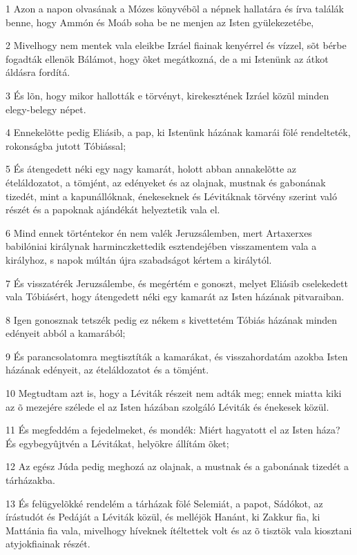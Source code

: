 \par 1 Azon a napon olvasának a Mózes könyvébõl a népnek hallatára és írva találák benne, hogy Ammón és Moáb soha be ne menjen az Isten gyülekezetébe,
\par 2 Mivelhogy nem mentek vala eleikbe Izráel fiainak kenyérrel és vízzel, sõt bérbe fogadták ellenök Bálámot, hogy õket megátkozná, de a mi Istenünk az átkot áldásra fordítá.
\par 3 És lõn, hogy mikor hallották e törvényt, kirekesztének Izráel közül minden elegy-belegy népet.
\par 4 Ennekelõtte pedig Eliásib, a pap, ki Istenünk házának kamarái fölé rendelteték, rokonságba jutott Tóbiással;
\par 5 És átengedett néki egy nagy kamarát, holott abban annakelõtte az ételáldozatot, a tömjént, az edényeket és az olajnak, mustnak és gabonának tizedét, mint a kapunállóknak, énekeseknek és Lévitáknak törvény szerint való részét és a papoknak ajándékát helyeztetik vala el.
\par 6 Mind ennek történtekor én nem valék Jeruzsálemben, mert Artaxerxes babilóniai királynak harminczkettedik esztendejében visszamentem vala a királyhoz, s napok múltán újra szabadságot kértem a királytól.
\par 7 És visszatérék Jeruzsálembe, és megértém e gonoszt, melyet Eliásib cselekedett vala Tóbiásért, hogy átengedett néki egy kamarát az Isten házának pitvaraiban.
\par 8 Igen gonosznak tetszék pedig ez nékem s kivettetém Tóbiás házának minden edényeit abból a kamarából;
\par 9 És parancsolatomra megtisztíták a kamarákat, és visszahordatám azokba Isten házának edényeit, az ételáldozatot és a tömjént.
\par 10 Megtudtam azt is, hogy a Léviták részeit nem adták meg; ennek miatta kiki az õ mezejére szélede el az Isten házában szolgáló Léviták és énekesek közül.
\par 11 És megfeddém a fejedelmeket, és mondék: Miért hagyatott el az Isten háza? És egybegyûjtvén a Lévitákat, helyökre állítám õket;
\par 12 Az egész Júda pedig meghozá az olajnak, a mustnak és a gabonának tizedét a tárházakba.
\par 13 És felügyelõkké rendelém a tárházak fölé Selemiát, a papot, Sádókot, az írástudót és Pedáját a Léviták közül, és melléjök Hanánt, ki Zakkur fia, ki Mattánia fia vala, mivelhogy híveknek ítéltettek volt és az õ tisztök vala kiosztani atyjokfiainak részét.
